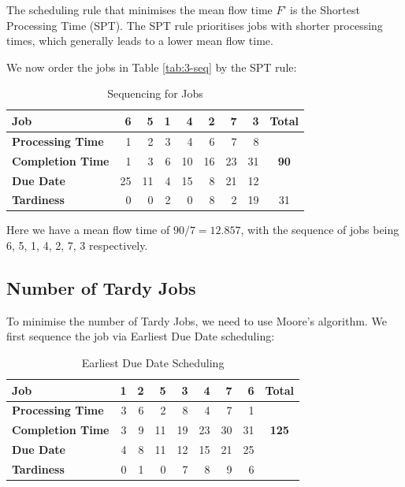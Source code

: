 \documentclass[12pt]{article}
\begin{document}
\begin{theorem}
    The scheduling rule that minimises the mean flow time $F$' is the Shortest Processing Time (SPT). The SPT rule prioritises jobs with shorter processing times, which generally leads to a lower mean flow time. 
\end{theorem}

\noindent We now order the jobs in Table \ref{tab:3-seq} by the SPT rule:

\begin{table}[H]
    \centering
    \begin{tabular}{l r r r r r r r | c }\toprule 
        \textbf{Job} & 6 & 5 & 1 & 4 & 2 & 7 & 3 & \textbf{Total}\\ \midrule 
        \textbf{Processing Time} & 1 & 2 & 3 & 4 & 6 & 7 & 8 \\ 
        \textbf{Completion Time} & 1 & 3 & 6 & 10 & 16 & 23 & 31 & \textbf{90} \\ 
        \textbf{Due Date} & 25 & 11 & 4 & 15 & 8 & 21 & 12 \\ 
        \textbf{Tardiness} & 0 & 0 & 2 & 0 & 8 & 2 & 19 & 31 \\ \bottomrule
    \end{tabular}
    \caption{Sequencing for Jobs}
    \label{tab:3-mft}
\end{table}

\noindent Here we have a mean flow time of $90 / 7 = \mathbf{12.857}$, with the sequence of jobs being 6, 5, 1, 4, 2, 7, 3 respectively. 

\subsection*{Number of Tardy Jobs}

To minimise the number of Tardy Jobs, we need to use Moore's algorithm. We first sequence the job via Earliest Due Date scheduling:

\begin{table}[H]
    \centering
    \begin{tabular}{l r r r r r r r | c }\toprule 
        \textbf{Job} & 1 & 2 & 5 & 3 & 4 & 7 & 6 & \textbf{Total}\\ \midrule 
        \textbf{Processing Time} & 3 & 6 & 2 & 8 & 4 & 7 & 1 \\ 
        \textbf{Completion Time} & 3 & 9 & 11 & 19 & 23 & 30 & 31 & \textbf{125} \\ 
        \textbf{Due Date} & 4 & 8 & 11 & 12 & 15 & 21 & 25 \\ 
        \textbf{Tardiness} & 0 & 1 & 0 & 7 & 8 & 9 & 6 & \\ \bottomrule
    \end{tabular}
    \caption{Earliest Due Date Scheduling}
    \label{tab:3-tardy1}
\end{table}
\end{document}
